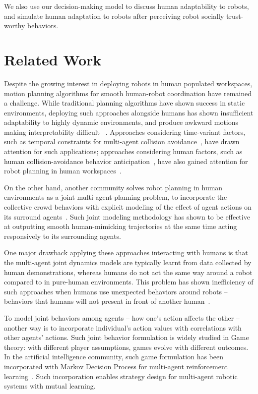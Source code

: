 \documentclass[letterpaper, 10 pt, conference]{ieeeconf}  %
\begin{document}
We also use our decision-making model to discuss human adaptability to robots,
and simulate human adaptation to robots after perceiving robot 
socially trust-worthy behaviors. 

\section{Related Work}
Despite the growing interest in deploying robots in human populated workspaces, 
motion planning algorithms for smooth human-robot coordination have remained a 
challenge. While traditional planning algorithms have shown success in static 
environments, deploying such approaches alongside humans has shown 
insufficient adaptability to highly dynamic environments, and produce awkward 
motions making 
interpretability difficult
~\cite{lichtenthaler2012influence,dragan2013legibility,kruse2012legible}. 
Approaches considering time-variant factors, such as temporal constraints for multi-agent collision 
avoidance~\cite{van2011reciprocal}, have drawn attention for such 
applications; approaches considering human factors, such as human 
collision-avoidance behavior anticipation~\cite{helbing1995social}, have also gained attention for robot planning in human workspaces~\cite{shiomi2014towards}.

On the other hand, another community solves robot planning in human environments as a 
joint multi-agent planning problem, to incorporate the collective crowd 
behaviors with explicit modeling of the effect of agent actions on its 
surround agents~\cite{trautman2010unfreezing,kuderer2012feature,mavrogiannis2016decentralized}. Such joint modeling methodology has 
shown to be effective at outputting smooth human-mimicking trajectories at the same 
time acting responsively to its surrounding agents.

One major drawback applying these approaches interacting with humans is that the 
multi-agent joint dynamics models are typically learnt from data collected by 
human demonstrations, whereas humans do not act the same way around a robot compared to in 
pure-human environments. This problem has shown 
inefficiency of such approaches when humans use unexpected behaviors 
around robots -- behaviors that humans will not present in front of another 
human~\cite{pfeiffer2016predicting}. 

To model joint behaviors among agents -- how one's action affects the other -- another way is to incorporate individual's action values with correlations 
with other agents' actions. Such joint behavior formulation is widely studied 
in Game theory: with different player assumptions, games evolve with different 
outcomes. In the artificial intelligence community, such game 
formulation has been incorporated with Markov Decision Process for multi-agent 
reinforcement learning~\cite{littman1994markov}. Such incorporation enables strategy 
design for multi-agent robotic systems with mutual learning. 
\end{document}

